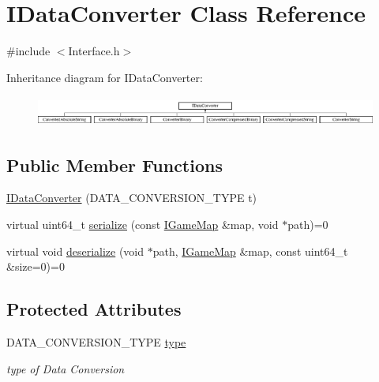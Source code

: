 \hypertarget{class_i_data_converter}{}\section{I\+Data\+Converter Class Reference}
\label{class_i_data_converter}


{\ttfamily \#include $<$Interface.\+h$>$}

Inheritance diagram for I\+Data\+Converter\+:\begin{figure}[H]
\begin{center}
\leavevmode
\includegraphics[height=1.014493cm]{class_i_data_converter}
\end{center}
\end{figure}
\subsection*{Public Member Functions}
\begin{DoxyCompactItemize}
\item 
\hyperlink{class_i_data_converter_a69329e2db98273475b56a4e16e6253f2}{I\+Data\+Converter} (D\+A\+T\+A\+\_\+\+C\+O\+N\+V\+E\+R\+S\+I\+O\+N\+\_\+\+T\+Y\+P\+E t)
\item 
virtual uint64\+\_\+t \hyperlink{class_i_data_converter_a358ecdbe04ae180f7e0bb68c0fa141c9}{serialize} (const \hyperlink{class_i_game_map}{I\+Game\+Map} \&map, void $\ast$path)=0
\item 
virtual void \hyperlink{class_i_data_converter_ab238c18813133efdc066e424dfc4b62e}{deserialize} (void $\ast$path, \hyperlink{class_i_game_map}{I\+Game\+Map} \&map, const uint64\+\_\+t \&size=0)=0
\end{DoxyCompactItemize}
\subsection*{Protected Attributes}
\begin{DoxyCompactItemize}
\item 
\hypertarget{class_i_data_converter_a84384b69b1f6cf25b7e5b57cc9a11568}{}D\+A\+T\+A\+\_\+\+C\+O\+N\+V\+E\+R\+S\+I\+O\+N\+\_\+\+T\+Y\+P\+E \hyperlink{class_i_data_converter_a84384b69b1f6cf25b7e5b57cc9a11568}{type}\label{class_i_data_converter_a84384b69b1f6cf25b7e5b57cc9a11568}

\begin{DoxyCompactList}\small\item\em type of Data Conversion \end{DoxyCompactList}\end{DoxyCompactItemize}


